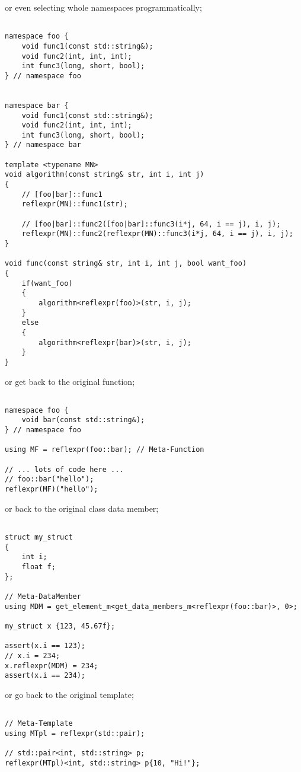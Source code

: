 or even selecting whole namespaces programmatically;

\begin{verbatim}

namespace foo {
	void func1(const std::string&);
	void func2(int, int, int);
	int func3(long, short, bool);
} // namespace foo


namespace bar {
	void func1(const std::string&);
	void func2(int, int, int);
	int func3(long, short, bool);
} // namespace bar

template <typename MN>
void algorithm(const string& str, int i, int j)
{
	// [foo|bar]::func1
	reflexpr(MN)::func1(str);

	// [foo|bar]::func2([foo|bar]::func3(i*j, 64, i == j), i, j);
	reflexpr(MN)::func2(reflexpr(MN)::func3(i*j, 64, i == j), i, j);
}

void func(const string& str, int i, int j, bool want_foo)
{
	if(want_foo)
	{
		algorithm<reflexpr(foo)>(str, i, j);
	}
	else 
	{
		algorithm<reflexpr(bar)>(str, i, j);
	}
}

\end{verbatim}

or get back to the original function;

\begin{verbatim}

namespace foo {
	void bar(const std::string&);
} // namespace foo

using MF = reflexpr(foo::bar); // Meta-Function

// ... lots of code here ...
// foo::bar("hello");
reflexpr(MF)("hello");

\end{verbatim}

or back to the original class data member;

\begin{verbatim}

struct my_struct
{
	int i;
	float f;
};

// Meta-DataMember
using MDM = get_element_m<get_data_members_m<reflexpr(foo::bar)>, 0>;

my_struct x {123, 45.67f};

assert(x.i == 123);
// x.i = 234;
x.reflexpr(MDM) = 234;
assert(x.i == 234);

\end{verbatim}

or go back to the original template;

\begin{verbatim}

// Meta-Template
using MTpl = reflexpr(std::pair);

// std::pair<int, std::string> p;
reflexpr(MTpl)<int, std::string> p{10, "Hi!"};

\end{verbatim}

